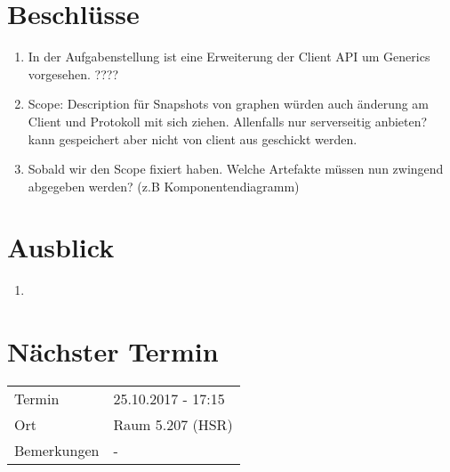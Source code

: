 \documentclass[11pt, a4paper,oneside]{scrartcl}
\begin{document}
\section{Beschlüsse}
\begin{enumerate}
	\item In der Aufgabenstellung ist eine Erweiterung der Client API um Generics vorgesehen. ????
	\item Scope: Description für Snapshots von graphen würden auch änderung am Client und Protokoll mit sich ziehen. Allenfalls nur serverseitig anbieten? kann gespeichert aber nicht von client aus geschickt werden.
	\item Sobald wir den Scope fixiert haben. Welche Artefakte müssen nun zwingend abgegeben werden? (z.B Komponentendiagramm)
\end{enumerate}

\section{Ausblick}
\begin{enumerate}
	\item 
\end{enumerate}

\section{Nächster Termin}
\begin{tabu} to \linewidth {l X }
	\toprule
	Termin & 25.10.2017 - 17:15 \\
	Ort & Raum 5.207 (HSR) \\
	Bemerkungen & - \\
	\bottomrule
\end{tabu}
\end{document}
